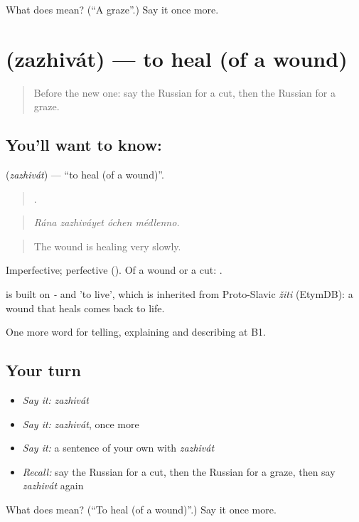 \begin{tcolorbox}[breakable,colback=teal!4,colframe=teal!35!black,title={Before you move on}]
What does  mean? (\textquotedblleft{}A graze\textquotedblright{}.) Say it once more.
\end{tcolorbox}
\section[\texorpdfstring{\ru{заживать} (zazhivát)}{заживать (zazhivát)}]{ (zazhivát) — to heal (of a wound)}

\label{lesson:RU-C483-zazhivat}



\begin{quote}
Before the new one: say the Russian for a cut, then the Russian for a graze.
\end{quote}

\subsection*{You'll want to know: }
\textbf{} (\emph{zazhivát}) — \textquotedblleft{}to heal (of a wound)\textquotedblright{}.

\begin{quote}
   .
\end{quote}

\begin{quote}
\emph{Rána zazhiváyet óchen médlenno.}
\end{quote}

\begin{quote}
The wound is healing very slowly.
\end{quote}

Imperfective; perfective  (). Of a wound or a cut: \emph{ }.

\begin{cousinweb}
\emph{} is built on \emph{-} and \emph{} 'to live', which is inherited from Proto-Slavic \emph{žiti} (EtymDB): a wound that heals comes back to life.
\end{cousinweb}

\begin{grammarlens}[title={What you've built}]
One more word for telling, explaining and describing at B1.
\end{grammarlens}

\subsection*{Your turn}
\begin{itemize}
\raggedright
  \item \emph{Say it:} \emph{zazhivát}
  \item \emph{Say it:} \emph{zazhivát}, once more
  \item \emph{Say it:} a sentence of your own with \emph{zazhivát}
  \item \emph{Recall:} say the Russian for a cut, then the Russian for a graze, then say \emph{zazhivát} again
\end{itemize}

\begin{tcolorbox}[breakable,colback=teal!4,colframe=teal!35!black,title={Before you move on}]
What does  mean? (\textquotedblleft{}To heal (of a wound)\textquotedblright{}.) Say it once more.
\end{tcolorbox}
